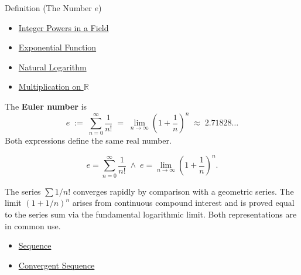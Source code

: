 \begin{definitionbox}{Definition (The Number $e$)}

\begin{dependencies}
\begin{itemize}
  \item \hyperref[def:two-sided-inverse]{Integer Powers in a Field}
  \item \hyperref[def:exponential]{Exponential Function}
  \item \hyperref[def:natural-logarithm]{Natural Logarithm}
  \item \hyperref[def:multiplication-on-r]{Multiplication on $\mathbb{R}$}
\end{itemize}
\end{dependencies}
\begin{definition}
\label{def:number-e}
The \textbf{Euler number} is
\[
  e \;:=\; \sum_{n=0}^{\infty} \frac{1}{n!}
  \;=\; \lim_{n \to \infty} \!\left(1 + \frac{1}{n}\right)^{\!n}
  \;\approx\; 2.71828\ldots
\]
Both expressions define the same real number.
\end{definition}
\end{definitionbox}

\begin{remark*}
\[
  e = \sum_{n=0}^\infty \frac{1}{n!}
  \;\wedge\;
  e = \lim_{n\to\infty}\!\left(1+\frac{1}{n}\right)^n.
\]
\end{remark*}

\begin{remark*}[Interpretation]
The series $\sum 1/n!$ converges rapidly by comparison with a
geometric series. The limit $(1+1/n)^n$ arises from continuous
compound interest and is proved equal to the series sum via the
fundamental logarithmic limit. Both representations are in common use.
\end{remark*}

\begin{dependencies}
\begin{itemize}
  \item \hyperref[def:sequence]{Sequence}
  \item \hyperref[def:convergent-sequence]{Convergent Sequence}
\end{itemize}
\end{dependencies}

